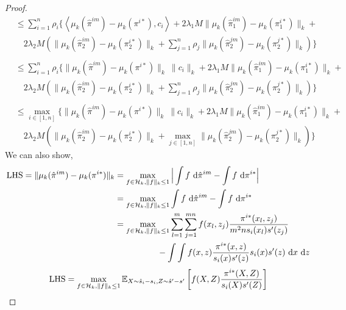 \begin{proof}
\begin{align*}
    &\leq \sum_{i=1}^n\rho_i \Bigg\{\left<\mu_k(\hat{\pi}^{im})-\mu_k(\pi^{i*}), c_i\right>+2\lambda_1M\|\mu_k(\hat{\pi}^{im}_1)-\mu_k(\pi^{i*}_1)\|_k +\\
    & \quad 2\lambda_2M\left( \| \mu_k(\hat{\pi}^{im}_2)-\mu_k(\pi^{i*}_2)\|_k + \sum_{j=1}^n\rho_j\|\mu_k(\hat{\pi}^{jm}_2) -\mu_k(\pi^{j*}_2)\|_k \right)
    \Bigg\}\\
    & \quad \tag{from triangle-inequality and linearity of the kernel mean embedding}\\
    &\leq \sum_{i=1}^n\rho_i \Bigg\{\|\mu_k(\hat{\pi}^{im})-\mu_k(\pi^{i*})\|_k\ \|c_i\|_k+2\lambda_1M\|\mu_k(\hat{\pi}^{im}_1)-\mu_k(\pi^{i*}_1)\|_k +\\
    & \quad 2\lambda_2M\left( \| \mu_k(\hat{\pi}^{im}_2)-\mu_k(\pi^{i*}_2)\|_k + \sum_{j=1}^n\rho_j\|\mu_k(\hat{\pi}^{jm}_2) -\mu_k(\pi^{j*}_2)\|_k \right)
    \Bigg\}\\
    & \quad \tag{from Cauchy Schwarz}\\
    &\leq \max\limits_{i\in[1, n]} \Bigg\{\|\mu_k(\hat{\pi}^{im})-\mu_k(\pi^{i*})\|_k\ \|c_i\|_k+2\lambda_1M\|\mu_k(\hat{\pi}^{im}_1)-\mu_k(\pi^{i*}_1)\|_k +\\
    & \quad 2\lambda_2M\left( \| \mu_k(\hat{\pi}^{im}_2)-\mu_k(\pi^{i*}_2)\|_k + \max\limits_{j\in[1, n]}\|\mu_k(\hat{\pi}^{jm}_2) -\mu_k(\pi^{j*}_2)\|_k \right)
    \Bigg\}
\end{align*}
We can also show,
\begin{align*}
    \textup{LHS}=\|\mu_k(\hat{\pi}^{im})-\mu_k(\pi^{i*})\|_k
    &=\max\limits_{f\in \mathcal{H}_k, \|f\|_k\leq 1} \Big|\int f~\textup{d}\hat{\pi}^{im}-\int f~\textup{d}\pi^{i*}\Big| \\
    &=\max\limits_{f\in \mathcal{H}_k, \|f\|_k\leq 1} \int f~\textup{d}\hat{\pi}^{im}-\int f~\textup{d}\pi^{i*}
    \\
    &=\max\limits_{f\in \mathcal{H}_k, \|f\|_k\leq 1} \sum_{l=1}^m\sum_{j=1}^{mn} f(x_l, z_j) \frac{\pi^{i*}(x_l, z_j)}{m^2ns_i(x_l)s'(z_j)}\nonumber\\
    &\qquad\qquad\quad-\int \int f(x, z) \frac{\pi^{i*}(x, z)}{s_i(x)s'(z)}s_i(x)s'(z)~\textup{d}x~\textup{d}z
\end{align*}
\begin{align*}
\textup{LHS}
    &=\max\limits_{f\in \calH_k, \|f\|_k\leq 1} \E_{X\sim \hat{s}_i-s_i, Z\sim \hat{s}'-s'}\left[f(X, Z)\frac{\pi^{i*}(X, Z)}{s_i(X)s'(Z)}\right]\\

\end{align*}
\end{proof}
